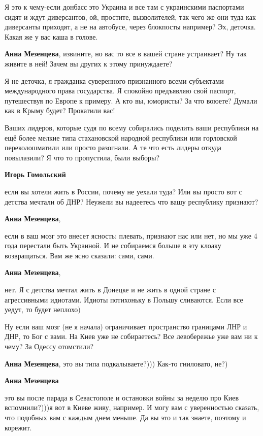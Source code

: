 \begin{itemize}
\begin{itemize}
Я это к чему-если донбасс это Украина и все там с украинскими паспортами сидят
и ждут диверсантов, ой, простите, вызволителей, так чего же они туда как диверсанты
приходят, а не на автобусе, через блокпосты например? Эх, деточка. Какая же у вас
каша в голове.

\textbf{Анна Мезенцева}, извините, но вас то все в вашей стране устраивает? Ну так живите в ней! Зачем вы других к этому принуждаете?


Я не деточка, я гражданка суверенного признанного всеми субъектами
международного права государства. Я спокойно предъявляю свой паспорт,
путешествуя по Европе к примеру. А кто вы, юмористы? За что воюете? Думали как
в Крыму будет? Прокатили вас!

Ваших лидеров, которые судя по всему собирались поделить ваши республики на ещё
более мелкие типа стахановской народной республики или горловской
переколошматили или просто разогнали. А те что есть лидеры откуда повылазили? Я
что то пропустила, были выборы?

\textbf{Игорь Гомольский} 

если вы хотели жить в России, почему не уехали туда? Или вы просто вот с
детства мечтали об ДНР? Неужели вы надеетесь что вашу республику признают?

\textbf{Анна Мезенцева},

если в ваш мозг это внесет ясность: плевать, признают нас или нет, но мы уже 4
года перестали быть Украиной. И не собираемся больше в эту клоаку возвращаться.
Вам же ясно сказали: сами, сами.

\textbf{Анна Мезенцева}, 

нет. Я с детства мечтал жить в Донецке и не жить в одной стране с агрессивными
идиотами. Идиоты потихоньку в Польшу сливаются. Если все уедут, то будет
неплохо)


Ну если ваш мозг (не я начала) ограничивает пространство границами ЛНР и ДНР,
то Бог с вами. На Киев уже не собираетесь? Все левобережье уже вам ни к чему?
За Одессу отомстили?

\textbf{Анна Мезенцева}, это вы типа подкалываете?))) Как-то гниловато, не?)

\textbf{Анна Мезенцева} 

это вы после парада в Севастополе и остановки войны за неделю про Киев
вспомнили?)))я вот в Киеве живу, например. И могу вам с уверенностью сказать, что
подобных вам с каждым днем меньше. Да вы это и так знаете, поэтому и корежит.



\end{itemize}
\end{itemize}
